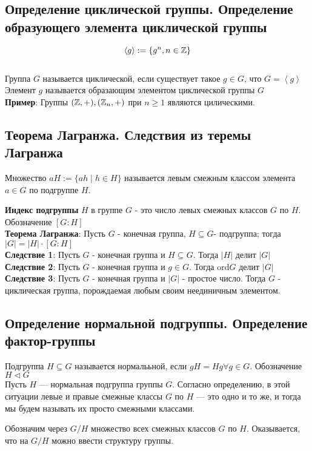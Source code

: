 \subsection{Определение циклической группы. Определение образующего элемента циклической группы}
$$\left\langle g \right\rangle  := \{g^n, n\in \mathbb{Z} \}$$ \\
Группа $G$ называется циклической, если существует такое $g\in G$, что $G = \left\langle g \right\rangle$\\
Элемент $g $  называется образающим элементом циклической группы $G$\\
\textbf{Пример}: Группы $(\mathbb{Z}, +), (\mathbb{Z}_n, + )$ при $n\geq 1$ являются цилическими. 
\subsection{Теорема Лагранжа. Следствия из теремы Лагранжа}
Множество \( aH := \{ ah \mid h \in H \} \) называется левым смежным классом элемента \( a \in G \) по подгруппе \( H \).

\textbf{Индекс подгруппы} $H$ в группе $G$ - это число левых смежных классов $G$ по $H$. Обозначение $ \left[G : H\right]$ \\
\textbf{Теорема Лагранжа}: Пусть $G$ - конечная группа, $H\subseteq G$- подгруппа; тогда $|G| = |H|\cdot \left[G : H\right]$ \\
\textbf{Следствие 1}: Пусть $G$ - конечная группа и $H\subseteq G$. Тогда $|H| $ делит $|G|$\\
\textbf{Следствие 2}: Пусть $G$ - конечная группа и $g\in G$. Тогда ord$G $ делит $|G|$\\
\textbf{Следствие 3}: Пусть $G$ - конечная группа и $|G|$ - простое число. Тогда $G$ - циклическая группа, порождаемая любым своим неединичным элементом.\\
\subsection{Определение нормальной подгруппы. Определение фактор-группы }
Подгруппа $H\subseteq G$ называется нормалььной, если $gH = Hg \forall g\in G$. Обозначение $H \triangleleft G$ \\
Пусть $H$ --- нормальная подгруппа группы $G$. Согласно определению, в этой ситуации левые и правые смежные классы $G$ по $H$ --- это одно и то же, и тогда мы будем называть их просто смежными классами.

Обозначим через $G/H$ множество всех смежных классов $G$ по $H$. Оказывается, что на $G/H$ можно ввести структуру группы.

